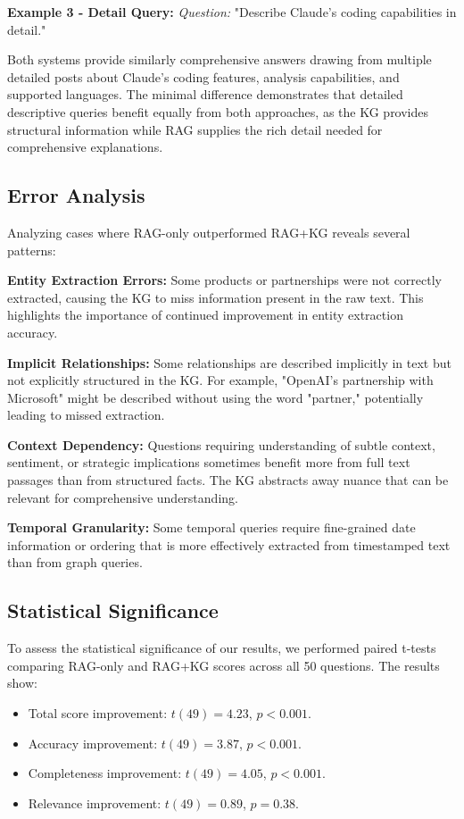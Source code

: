\documentclass[11pt,twocolumn]{article}
\begin{document}
\textbf{Example 3 - Detail Query:}
\textit{Question:} "Describe Claude's coding capabilities in detail."

Both systems provide similarly comprehensive answers drawing from multiple detailed posts about Claude's coding features, analysis capabilities, and supported languages. The minimal difference demonstrates that detailed descriptive queries benefit equally from both approaches, as the KG provides structural information while RAG supplies the rich detail needed for comprehensive explanations.

\subsection{Error Analysis}

Analyzing cases where RAG-only outperformed RAG+KG reveals several patterns:

\textbf{Entity Extraction Errors:} Some products or partnerships were not correctly extracted, causing the KG to miss information present in the raw text. This highlights the importance of continued improvement in entity extraction accuracy.

\textbf{Implicit Relationships:} Some relationships are described implicitly in text but not explicitly structured in the KG. For example, "OpenAI's partnership with Microsoft" might be described without using the word "partner," potentially leading to missed extraction.

\textbf{Context Dependency:} Questions requiring understanding of subtle context, sentiment, or strategic implications sometimes benefit more from full text passages than from structured facts. The KG abstracts away nuance that can be relevant for comprehensive understanding.

\textbf{Temporal Granularity:} Some temporal queries require fine-grained date information or ordering that is more effectively extracted from timestamped text than from graph queries.

\subsection{Statistical Significance}

To assess the statistical significance of our results, we performed paired t-tests comparing RAG-only and RAG+KG scores across all 50 questions. The results show:

\begin{itemize}
\item Total score improvement: $t(49)=4.23$, $p<0.001$.
\item Accuracy improvement: $t(49)=3.87$, $p<0.001$.
\item Completeness improvement: $t(49)=4.05$, $p<0.001$.
\item Relevance improvement: $t(49)=0.89$, $p=0.38$.
\end{itemize}
\end{document}
